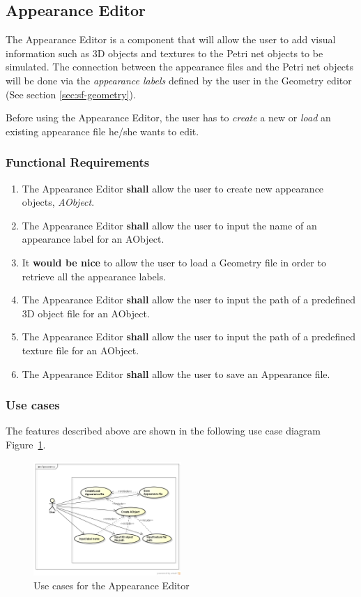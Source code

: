 \subsection{Appearance Editor}
\label{sec:sf-appearance}

The Appearance Editor is a component that will allow the user to add visual information such as 3D objects and textures to the Petri net objects to be simulated. The connection between the appearance files and the Petri net objects will be done via the \textit{appearance labels} defined by the user in the Geometry editor (See section \ref{sec:sf-geometry}). 

Before using the Appearance Editor, the user has to \textit{create} a new or \textit{load} an existing appearance file he/she wants to edit.

\subsubsection{Functional Requirements}

\begin{enumerate}
\item The Appearance Editor \textbf{shall} allow the user to create new appearance objects, \textit{AObject}.
\item The Appearance Editor \textbf{shall} allow the user to input the name of an appearance label for an AObject.
\item It \textbf{would be nice} to allow the user to load a Geometry file in order to retrieve all the appearance labels.
\item The Appearance Editor \textbf{shall} allow the user to input the path of a predefined 3D object file for an  AObject.
\item The Appearance Editor \textbf{shall} allow the user to input the path of a predefined texture file for an AObject.
\item The Appearance Editor \textbf{shall} allow the user to save an Appearance file.
     
\end{enumerate}

\subsubsection{Use cases}

The features described above are shown in the following use case diagram Figure~\ref{fig:use-cases-appearance-editor}.

\begin{figure}[htp]
\begin{center}
  \includegraphics[width=0.5\textwidth]{image/uc-appearance.png}
  \caption{Use cases for the Appearance Editor}
  \label{fig:use-cases-appearance-editor}
\end{center}
\end{figure}

